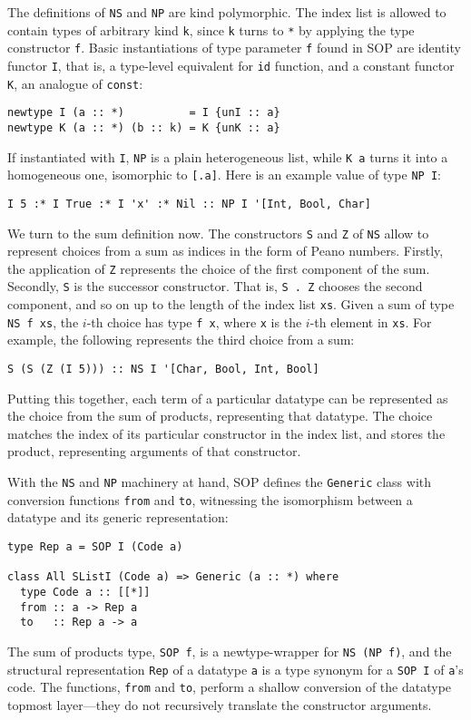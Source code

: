 \documentclass[runningheads]{llncs}
\newcommand{\K}[1]{\lstinline[style=fancy]{#1}}
\begin{document}
The definitions of \K{NS} and \K{NP} are kind polymorphic. The index list is allowed to contain types of arbitrary kind \K{k}, since \K{k} turns to \K{*} by applying the type constructor \K{f}.
Basic instantiations of type parameter \K{f} found in SOP are identity functor \K{I}, that is, a type-level equivalent for \K{id} function, and a constant functor \K{K}, an analogue of \K{const}:
\begin{lstlisting}[style=fancy]
newtype I (a :: *)          = I {unI :: a}
newtype K (a :: *) (b :: k) = K {unK :: a}
\end{lstlisting}
If instantiated with \K{I}, \K{NP} is a plain heterogeneous list, while \K{K a} turns it into a homogeneous one, isomorphic to \K{[.a]}. Here is an example value of type \K{NP I}:
\begin{lstlisting}[style=fancy]
I 5 :* I True :* I 'x' :* Nil :: NP I '[Int, Bool, Char]
\end{lstlisting}

We turn to the sum definition now. The constructors \K{S} and \K{Z} of \K{NS} allow to represent choices from a sum as indices in the form of Peano numbers. Firstly, the application of \K{Z} represents the choice of the first component of the sum. Secondly, \K{S} is the successor constructor. That is, \K{S . Z} chooses the second component, and so on up to the length of the index list \K{xs}. Given a sum of type \K{NS f xs}, the $i$-th choice has type \K{f x}, where \K{x} is the $i$-th element in \K{xs}. For example, the following represents the third choice from a sum:
\begin{lstlisting}[style=fancy]
S (S (Z (I 5))) :: NS I '[Char, Bool, Int, Bool]
\end{lstlisting}
Putting this together, each term of a particular datatype can be represented as the choice from the sum of products, representing that datatype. The choice matches the index of its particular constructor in the index list, and stores the product, representing arguments of that constructor.

With the \K{NS} and \K{NP} machinery at hand, SOP defines the \K{Generic} class with conversion functions \K{from} and \K{to}, witnessing the isomorphism between a datatype and its generic representation:
\begin{lstlisting}[style=fancy]
type Rep a = SOP I (Code a)

class All SListI (Code a) => Generic (a :: *) where
  type Code a :: [[*]]
  from :: a -> Rep a
  to   :: Rep a -> a
\end{lstlisting}
The sum of products type, \K{SOP f}, is a newtype-wrapper for \K{NS (NP f)}, and the structural representation \K{Rep} of a datatype \K{a} is a type synonym for a \K{SOP I} of \K{a}'s code. The functions, \K{from} and \K{to}, perform a shallow conversion of the datatype topmost layer---they do not recursively translate the constructor arguments.
\end{document}
